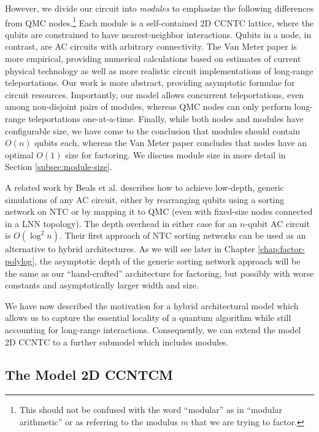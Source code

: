However, we divide our
circuit into \emph{modules} to emphasize the following differences from
\textsf{QMC} nodes.\footnote{This should not be
confused with the word ``modular'' as in ``modular arithmetic'' or as
referring to the modulus $m$ that we are trying to factor.}
Each module is a self-contained \textsf{2D CCNTC} lattice, where the qubits
are constrained to have nearest-neighbor interactions. Qubits in a node,
in contrast, are \textsf{AC} circuits with arbitrary connectivity. The
Van Meter paper is more empirical, providing numerical calculations
based on estimates of current physical technology as well as more realistic
circuit implementations of long-range teleportations. Our work is more
abstract, providing asymptotic formulae for circuit resources. Importantly,
our model allows concurrent teleportations, even among non-disjoint
pairs of modules, whereas \textsf{QMC} nodes can only perform long-range
teleportations one-at-a-time. Finally,
while both nodes and modules have configurable size, we have come to the
conclusion that modules should contain $O(n)$ qubits each, whereas
the Van Meter paper concludes that nodes have an optimal $O(1)$ size for 
factoring.
We discuss module size in more detail in Section \ref{subsec:module-size}.

A related work by Beals et al. \cite{Beals2012} describes how to achieve
low-depth, generic simulations of any \textsf{AC} circuit, either by
rearranging qubits using a sorting network on \textsf{NTC} or
by mapping it to \textsf{QMC}
(even with fixed-size nodes connected in a \textsf{LNN} topology). The
depth overhead in either case for an $n$-qubit \textsf{AC} circuit is $O(\log^2 n)$. Their first approach of \textsf{NTC} sorting networks can be used
as an alternative to hybrid architectures. As we will see later in
Chapter \ref{chap:factor-polylog}, the asymptotic depth of the generic sorting network approach will be the same as our ``hand-crafted'' architecture for factoring,
but possibly with worse constants and asymptotically larger width and size. 

We have now described the motivation for a hybrid architectural model which
allows us to capture the essential locality of a quantum algorithm while
still accounting for long-range interactions. Consequently, we can
extend the model \textsf{2D CCNTC} to a further submodel which includes
modules.

\subsection{The Model \textsf{2D CCNTCM}}
\label{subsec:2dccntcm}

